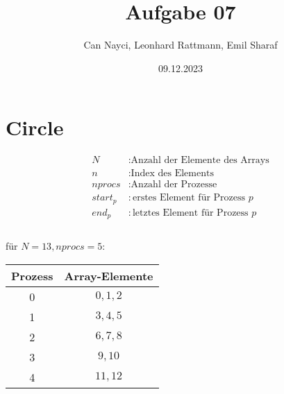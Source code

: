 \documentclass[a4paper,10pt]{article}
\title{Aufgabe 07}
\author{Can Nayci, Leonhard Rattmann, Emil Sharaf}
\date{09.12.2023}
\begin{document}
\maketitle

\section{Circle}
\begin{align*}
 N &: \text{Anzahl der Elemente des Arrays} \\
 n &: \text{Index des Elements} \\
 nprocs &: \text{Anzahl der Prozesse} \\
 start_p &: \text{erstes Element für Prozess } p\\
 end_p &: \text{letztes Element für Prozess } p\\
\end{align*}\\
für $N = 13, nprocs = 5$:
\begin{tabular}{c | c}
 Prozess & Array-Elemente \\
 \hline
 0 & $0,1,2$\\
 1 & $3,4,5$\\
 2 & $6,7,8$\\
 3 & $9,10$\\
 4 & $11,12$\\
\end{tabular}
\end{document}
